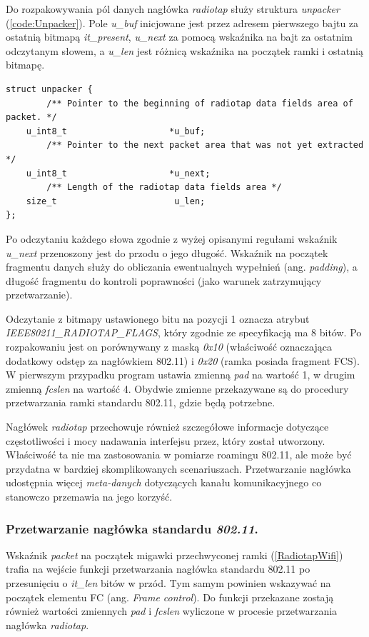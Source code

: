 Do rozpakowywania pól danych nagłówka \emph{radiotap} służy struktura \emph{unpacker} (\ref{code:Unpacker}). Pole \emph{u\_buf} inicjowane jest przez adresem pierwszego bajtu za ostatnią bitmapą \emph{it\_present}, \emph{u\_next} za pomocą  wskaźnika na bajt za ostatnim odczytanym słowem, a \emph{u\_len} jest różnicą wskaźnika na początek ramki i ostatnią bitmapę. 

\begin{lstlisting}[frame=tb]
struct unpacker {
        /** Pointer to the beginning of radiotap data fields area of packet. */
	u_int8_t					*u_buf;
        /** Pointer to the next packet area that was not yet extracted */
	u_int8_t					*u_next;
        /** Length of the radiotap data fields area */
	size_t						 u_len;
};
\end{lstlisting}

Po odczytaniu każdego słowa zgodnie z wyżej opisanymi regułami wskaźnik \emph{u\_next} przenoszony jest do przodu o jego długość. Wskaźnik na początek fragmentu danych służy do obliczania ewentualnych wypełnień (ang. \emph{padding}), a długość fragmentu do kontroli poprawności (jako warunek zatrzymujący przetwarzanie).

Odczytanie z bitmapy ustawionego bitu na pozycji 1 oznacza atrybut \emph{IEEE80211\_RADIOTAP\_FLAGS}, który zgodnie ze specyfikacją ma 8 bitów. Po rozpakowaniu jest on porównywany z maską \emph{0x10} (właściwość oznaczająca dodatkowy odstęp za nagłówkiem 802.11) i \emph{0x20} (ramka posiada fragment FCS). W pierwszym przypadku program ustawia zmienną \emph{pad} na wartość 1, w drugim zmienną \emph{fcslen} na wartość 4. Obydwie zmienne przekazywane są do procedury przetwarzania ramki standardu 802.11, gdzie będą potrzebne. 

Nagłówek \emph{radiotap} przechowuje również szczegółowe informacje dotyczące częstotliwości i mocy nadawania interfejsu przez, który został utworzony. Właściwość ta nie ma zastosowania w pomiarze roamingu 802.11, ale może być przydatna w bardziej skomplikowanych scenariuszach. Przetwarzanie nagłówka udostępnia więcej \emph{meta-danych} dotyczących kanału komunikacyjnego co stanowczo przemawia na jego korzyść. 

\subsubsection{Przetwarzanie nagłówka standardu \emph{802.11}.}

Wskaźnik \emph{packet} na początek migawki przechwyconej ramki (\ref{RadiotapWifi}) trafia na wejście funkcji przetwarzania nagłówka standardu 802.11 po przesunięciu o \emph{it\_len} bitów w przód. Tym samym powinien wskazywać na początek elementu FC (ang. \emph{Frame control}). Do funkcji przekazane zostają również wartości zmiennych \emph{pad} i \emph{fcslen} wyliczone w procesie przetwarzania nagłówka \emph{radiotap}. 

